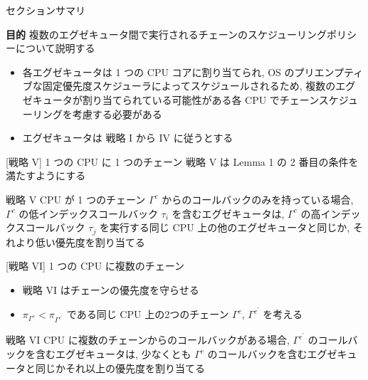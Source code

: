 \begin{frame}{セクションサマリ}
    \begin{itembox}[l]{\textbf{目的}}
        複数のエグゼキュータ間で実行されるチェーンのスケジューリングポリシーについて説明する
    \end{itembox}
\end{frame}

\begin{frame}{}
    \begin{itemize}
        \item 各エグゼキュータは 1 つの CPU コアに割り当てられ, OS のプリエンプティブな固定優先度スケジューラによってスケジュールされるため, 複数のエグゼキュータが割り当てられている可能性がある各 CPU でチェーンスケジューリングを考慮する必要がある
        \item エグゼキュータは 戦略 I から IV に従うとする
    \end{itemize}
\end{frame}

\begin{frame}{[戦略 V] 1 つの CPU に 1 つのチェーン}
    戦略 V は Lemma 1 の 2 番目の条件を満たすようにする
    \begin{block}{戦略 V}
        CPU が 1 つのチェーン $\Gamma^{c}$ からのコールバックのみを持っている場合, $\Gamma^{c}$ の低インデックスコールバック $\tau_{i}$ を含むエグゼキュータは, $\Gamma^{c}$ の高インデックスコールバック $\tau_{j}$ を実行する同じ CPU 上の他のエグゼキュータと同じか, それより低い優先度を割り当てる
    \end{block}
\end{frame}

\begin{frame}{[戦略 VI]  1 つの CPU に複数のチェーン}
    \begin{itemize}
        \item 戦略 VI はチェーンの優先度を守らせる
        \item $\pi_{\Gamma^{c}}<\pi_{\Gamma^{c^{\prime}}}$ である同じ CPU 上の2つのチェーン $\Gamma^{c}$, $\Gamma^{c^{\prime}}$ を考える
    \end{itemize}
    \begin{block}{戦略 VI}
        CPU に複数のチェーンからのコールバックがある場合, $\Gamma^{c^{\prime}}$ のコールバックを含むエグゼキュータは, 少なくとも $\Gamma^{c}$ のコールバックを含むエグゼキュータと同じかそれ以上の優先度を割り当てる
    \end{block}
\end{frame}


